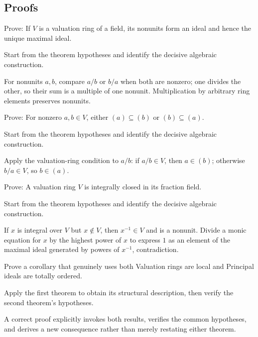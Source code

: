 \subsection*{Proofs}

\begin{exercise}\label{exr:v21-expand-06}
Prove: If $V$ is a valuation ring of a field, its nonunits form an ideal and hence the unique maximal ideal.
\end{exercise}
\begin{hint}
Start from the theorem hypotheses and identify the decisive algebraic construction.
\end{hint}
\begin{solution}
For nonunits $a,b$, compare $a/b$ or $b/a$ when both are nonzero; one divides the other, so their sum is a multiple of one nonunit. Multiplication by arbitrary ring elements preserves nonunits.
\end{solution}

\begin{exercise}\label{exr:v21-expand-07}
Prove: For nonzero $a,b\in V$, either $(a)\subseteq(b)$ or $(b)\subseteq(a)$.
\end{exercise}
\begin{hint}
Start from the theorem hypotheses and identify the decisive algebraic construction.
\end{hint}
\begin{solution}
Apply the valuation-ring condition to $a/b$: if $a/b\in V$, then $a\in(b)$; otherwise $b/a\in V$, so $b\in(a)$.
\end{solution}

\begin{exercise}\label{exr:v21-expand-08}
Prove: A valuation ring $V$ is integrally closed in its fraction field.
\end{exercise}
\begin{hint}
Start from the theorem hypotheses and identify the decisive algebraic construction.
\end{hint}
\begin{solution}
If $x$ is integral over $V$ but $x\notin V$, then $x^{-1}\in V$ and is a nonunit. Divide a monic equation for $x$ by the highest power of $x$ to express $1$ as an element of the maximal ideal generated by powers of $x^{-1}$, contradiction.
\end{solution}

\begin{exercise}\label{exr:v21-expand-09}
Prove a corollary that genuinely uses both Valuation rings are local and Principal ideals are totally ordered.
\end{exercise}
\begin{hint}
Apply the first theorem to obtain its structural description, then verify the second theorem's hypotheses.
\end{hint}
\begin{solution}
A correct proof explicitly invokes both results, verifies the common hypotheses, and derives a new consequence rather than merely restating either theorem.
\end{solution}

